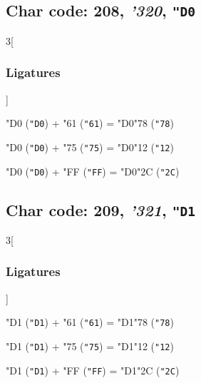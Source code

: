 \documentclass{article}
\newlength{\maxcharwidth}
\begin{document}
\subsection{Char code: 208, {\it'320}, {\tt"D0}}
\label{char_208}


\begin{multicols}{3}[\subsubsection{Ligatures}]

{\testfont\char"D0\noboundary} ({\tt"D0}) + {\testfont\char"61\noboundary} ({\tt"61}) = {\testfont\char"D0\noboundary}{\testfont\char"78\noboundary} ({\tt"78}) 

{\testfont\char"D0\noboundary} ({\tt"D0}) + {\testfont\char"75\noboundary} ({\tt"75}) = {\testfont\char"D0\noboundary}{\testfont\char"12\noboundary} ({\tt"12}) 

{\testfont\char"D0\noboundary} ({\tt"D0}) + {\testfont\char"FF\noboundary} ({\tt"FF}) = {\testfont\char"D0\noboundary}{\testfont\char"2C\noboundary} ({\tt"2C}) 

\end{multicols}

\subsection{Char code: 209, {\it'321}, {\tt"D1}}
\label{char_209}


\begin{multicols}{3}[\subsubsection{Ligatures}]

{\testfont\char"D1\noboundary} ({\tt"D1}) + {\testfont\char"61\noboundary} ({\tt"61}) = {\testfont\char"D1\noboundary}{\testfont\char"78\noboundary} ({\tt"78}) 

{\testfont\char"D1\noboundary} ({\tt"D1}) + {\testfont\char"75\noboundary} ({\tt"75}) = {\testfont\char"D1\noboundary}{\testfont\char"12\noboundary} ({\tt"12}) 

{\testfont\char"D1\noboundary} ({\tt"D1}) + {\testfont\char"FF\noboundary} ({\tt"FF}) = {\testfont\char"D1\noboundary}{\testfont\char"2C\noboundary} ({\tt"2C}) 

\end{multicols}
\end{document}
